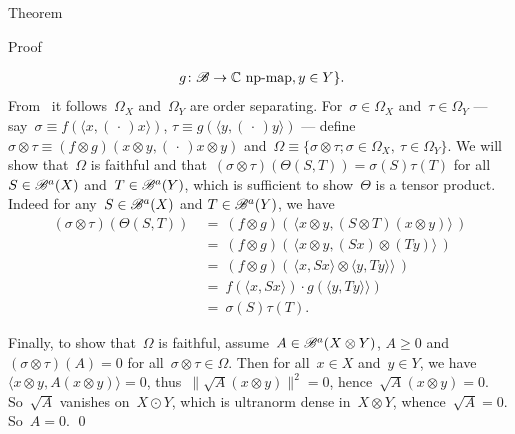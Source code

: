\begin{parsec}
\begin{point}{Theorem}
\begin{point}{Proof}
\begin{point}
\begin{point}
\begin{align*}
                    \ g \colon \mathscr{B} \to \mathbb{C} \text{ np-map}, y\in Y \}.
    \end{align*}
From~
    it follows~$\Omega_X$  and~$\Omega_Y$ are order separating.
For~$\sigma \in \Omega_X$ and~$\tau \in \Omega_Y$
 --- say~$\sigma \equiv f(\langle x, (\,\cdot\,) x\rangle)$,
    $\tau \equiv g(\langle y, (\,\cdot\,) y\rangle)$ ---
    define~$\sigma \otimes \tau \equiv
        (f \otimes g) (x \otimes y, (\,\cdot\,) x\otimes y) $
        and~$\Omega \equiv \{\sigma \otimes \tau; \sigma \in \Omega_X,
                    \ \tau \in \Omega_Y\}$.
We will show
    that~$\Omega$ is faithful
    and that~$(\sigma \otimes \tau)(\Theta(S,T)) = \sigma(S) \tau(T)$
    for all~$S \in \mathscr{B}^a(X)$ and~$T \in \mathscr{B}^a(Y)$,
    which is sufficient to show~$\Theta$ is a tensor product.
Indeed for any~$S \in \mathscr{B}^a(X)$ and $T \in \mathscr{B}^a(Y)$, we have
\begin{align*}
    (\sigma \otimes \tau)(\Theta(S, T))
        &\ = \ (f \otimes g) (\, \langle x \otimes y, 
                (S \otimes T) (x \otimes y) \rangle\,)\\
        &\ = \ (f \otimes g) (\,\langle x \otimes y, 
                (S x) \otimes (T y)\rangle\,)\\
        &\ = \ (f \otimes g) (\,
            \langle x, Sx\rangle \otimes
            \langle y, Ty\rangle \rangle\,)\\
        &\ = \ 
            f(\langle x, Sx\rangle ) \cdot
            g(\langle y, Ty\rangle \rangle)\\
        &\ = \ 
            \sigma(S) \tau(T).
\end{align*}
\end{point}
\begin{point}%
Finally, to show that~$\Omega$ is faithful,
        assume~$A \in \mathscr{B}^a(X \otimes Y)$, $A \geq 0$
        and $(\sigma \otimes \tau)(A) = 0$
        for all~$\sigma \otimes \tau \in \Omega$.
Then for all~$x \in X$ and~$y \in Y$,
    we have~$\langle x\otimes y, A (x\otimes y)\rangle = 0$,
        thus~$\| \sqrt{A} (x \otimes y) \|^2 = 0$,
        hence~$\sqrt{A} (x \otimes y) = 0$.
So~$\sqrt{A}$ vanishes on~$X \odot Y$,
    which is ultranorm dense in~$X \otimes Y$,
    whence~$\sqrt{A} = 0$. So~$A = 0$.
\qed
\end{point}
\end{point}
\end{point}
\end{point}
\end{parsec}

